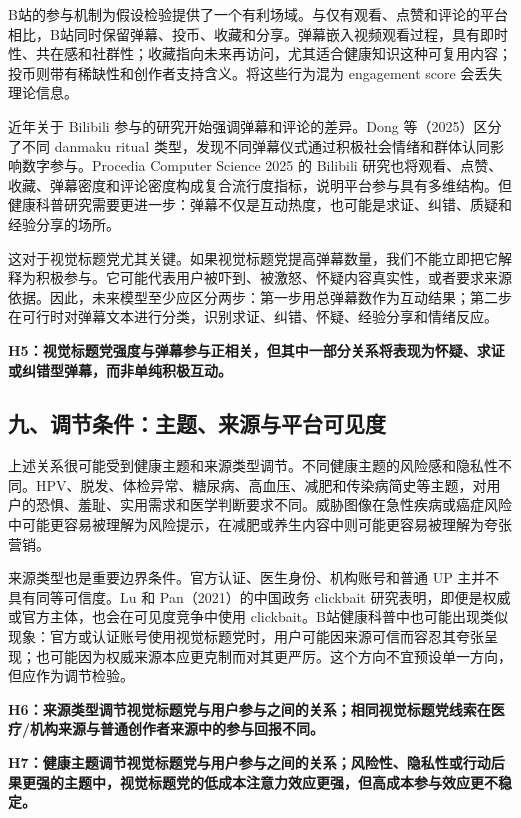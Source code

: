 \documentclass[
  12pt,
]{article}
\begin{document}
B站的参与机制为假设检验提供了一个有利场域。与仅有观看、点赞和评论的平台相比，B站同时保留弹幕、投币、收藏和分享。弹幕嵌入视频观看过程，具有即时性、共在感和社群性；收藏指向未来再访问，尤其适合健康知识这种可复用内容；投币则带有稀缺性和创作者支持含义。将这些行为混为
engagement score 会丢失理论信息。

近年关于 Bilibili 参与的研究开始强调弹幕和评论的差异。Dong
等（2025）区分了不同 danmaku ritual
类型，发现不同弹幕仪式通过积极社会情绪和群体认同影响数字参与。Procedia
Computer Science 2025 的 Bilibili
研究也将观看、点赞、收藏、弹幕密度和评论密度构成复合流行度指标，说明平台参与具有多维结构。但健康科普研究需要更进一步：弹幕不仅是互动热度，也可能是求证、纠错、质疑和经验分享的场所。

这对于视觉标题党尤其关键。如果视觉标题党提高弹幕数量，我们不能立即把它解释为积极参与。它可能代表用户被吓到、被激怒、怀疑内容真实性，或者要求来源依据。因此，未来模型至少应区分两步：第一步用总弹幕数作为互动结果；第二步在可行时对弹幕文本进行分类，识别求证、纠错、怀疑、经验分享和情绪反应。

\textbf{H5：视觉标题党强度与弹幕参与正相关，但其中一部分关系将表现为怀疑、求证或纠错型弹幕，而非单纯积极互动。}

\subsection{九、调节条件：主题、来源与平台可见度}\label{ux4e5dux8c03ux8282ux6761ux4ef6ux4e3bux9898ux6765ux6e90ux4e0eux5e73ux53f0ux53efux89c1ux5ea6}

上述关系很可能受到健康主题和来源类型调节。不同健康主题的风险感和隐私性不同。HPV、脱发、体检异常、糖尿病、高血压、减肥和传染病简史等主题，对用户的恐惧、羞耻、实用需求和医学判断要求不同。威胁图像在急性疾病或癌症风险中可能更容易被理解为风险提示，在减肥或养生内容中则可能更容易被理解为夸张营销。

来源类型也是重要边界条件。官方认证、医生身份、机构账号和普通 UP
主并不具有同等可信度。Lu 和 Pan（2021）的中国政务 clickbait
研究表明，即便是权威或官方主体，也会在可见度竞争中使用
clickbait。B站健康科普中也可能出现类似现象：官方或认证账号使用视觉标题党时，用户可能因来源可信而容忍其夸张呈现；也可能因为权威来源本应更克制而对其更严厉。这个方向不宜预设单一方向，但应作为调节检验。

\textbf{H6：来源类型调节视觉标题党与用户参与之间的关系；相同视觉标题党线索在医疗/机构来源与普通创作者来源中的参与回报不同。}

\textbf{H7：健康主题调节视觉标题党与用户参与之间的关系；风险性、隐私性或行动后果更强的主题中，视觉标题党的低成本注意力效应更强，但高成本参与效应更不稳定。}
\end{document}
